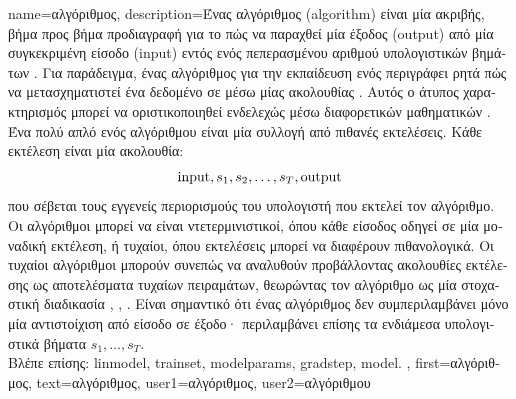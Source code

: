 {name={\foreignlanguage{greek}{αλγόριθμος}},
  description={\foreignlanguage{greek}{Ένας} \foreignlanguage{greek}{αλγόριθμος} (algorithm) \foreignlanguage{greek}{είναι μία ακριβής, βήμα προς βήμα προδιαγραφή για το πώς να παραχθεί μία έξοδος} (output) \foreignlanguage{greek}{από μία συγκεκριμένη είσοδο} (input) \foreignlanguage{greek}{εντός ενός πεπερασμένου αριθμού υπολογιστικών βημάτων} \cite{Cormen:2022aa}. 
    \foreignlanguage{greek}{Για παράδειγμα, ένας αλγόριθμος για την εκπαίδευση ενός}  \foreignlanguage{greek}{περιγράφει ρητά πώς να μετασχηματιστεί ένα δεδομένο}  \foreignlanguage{greek}{σε}  \foreignlanguage{greek}{μέσω μίας ακολουθίας} . 
    \foreignlanguage{greek}{Αυτός ο άτυπος χαρακτηρισμός μπορεί να οριστικοποιηθεί ενδελεχώς μέσω διαφορετικών μαθηματικών}  \cite{Sipser2013}. 
    \foreignlanguage{greek}{Ένα πολύ απλό}  \foreignlanguage{greek}{ενός αλγόριθμου είναι μία συλλογή από πιθανές εκτελέσεις. Κάθε εκτέλεση είναι μία ακολουθία:}
    $${\rm input},s_1,s_2,\ldots,s_T,{\rm output}$$ 
    \foreignlanguage{greek}{που σέβεται τους εγγενείς περιορισμούς του υπολογιστή που εκτελεί τον αλγόριθμο.}
	\foreignlanguage{greek}{Οι αλγόριθμοι μπορεί να είναι ντετερμινιστικοί, όπου κάθε είσοδος οδηγεί σε μία μοναδική εκτέλεση, 
	ή τυχαίοι, όπου εκτελέσεις μπορεί να διαφέρουν πιθανολογικά. Οι τυχαίοι αλγόριθμοι μπορούν συνεπώς να αναλυθούν προβάλλοντας ακολουθίες εκτέλεσης ως αποτελέσματα τυχαίων πειραμάτων,
	θεωρώντας τον αλγόριθμο ως μία στοχαστική διαδικασία} \cite{BertsekasProb}, \cite{RandomizedAlgos}, \cite{Gallager13}.
	\foreignlanguage{greek}{Είναι σημαντικό ότι ένας αλγόριθμος δεν συμπεριλαμβάνει μόνο μία αντιστοίχιση από είσοδο σε έξοδο· περιλαμβάνει επίσης τα ενδιάμεσα υπολογιστικά βήματα} 
	$s_1,\ldots,s_T$. \\
	\foreignlanguage{greek}{Βλέπε επίσης:} \gls{linmodel}, \gls{trainset}, \gls{modelparams}, \gls{gradstep}, \gls{model}.
	},
	first={\foreignlanguage{greek}{αλγόριθμος}},
	text={\foreignlanguage{greek}{αλγόριθμος}},
	user1={\foreignlanguage{greek}{αλγόριθμος}}, %
	user2={\foreignlanguage{greek}{αλγόριθμου}} %
}

